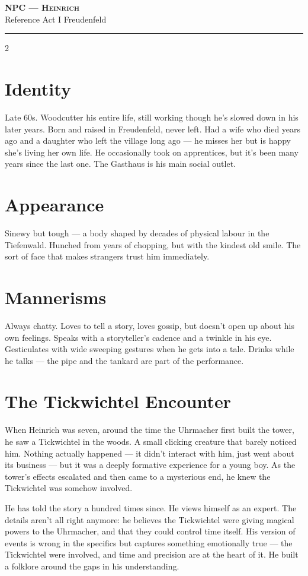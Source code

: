 \documentclass[10pt,letterpaper]{article}
\newcommand{\sceneheader}[4]{%
  \fancyhead[L]{\small\textcolor{accent}{\scshape #1}}%
  \fancyhead[R]{\small\textcolor{accent}{#2 \quad \textbullet \quad #3}}%
  \begin{center}
  {\LARGE\bfseries\scshape\textcolor{accent}{#1}}\\[2pt]
  {\small #2 \quad \textbullet \quad #3 \quad \textbullet \quad #4}\\[2pt]
  \textcolor{rulecol}{\rule{0.5\textwidth}{0.8pt}}
  \end{center}
  \vspace{-4pt}
}
\begin{document}
\label{sec:npc-heinrich}\sceneheader{NPC --- Heinrich}{Reference}{Act I}{Freudenfeld}

\begin{multicols}{2}

\section*{Identity}
Late 60s. Woodcutter his entire life, still working though he's slowed down in his later years. Born and raised in Freudenfeld, never left. Had a wife who died years ago and a daughter who left the village long ago --- he misses her but is happy she's living her own life. He occasionally took on apprentices, but it's been many years since the last one. The Gasthaus is his main social outlet.

\section*{Appearance}
Sinewy but tough --- a body shaped by decades of physical labour in the Tiefenwald. Hunched from years of chopping, but with the kindest old smile. The sort of face that makes strangers trust him immediately.

\section*{Mannerisms}
Always chatty. Loves to tell a story, loves gossip, but doesn't open up about his own feelings. Speaks with a storyteller's cadence and a twinkle in his eye. Gesticulates with wide sweeping gestures when he gets into a tale. Drinks while he talks --- the pipe and the tankard are part of the performance.

\section*{The Tickwichtel Encounter}
When Heinrich was seven, around the time the Uhrmacher first built the tower, he saw a Tickwichtel in the woods. A small clicking creature that barely noticed him. Nothing actually happened --- it didn't interact with him, just went about its business --- but it was a deeply formative experience for a young boy. As the tower's effects escalated and then came to a mysterious end, he knew the Tickwichtel was somehow involved.

He has told the story a hundred times since. He views himself as an expert. The details aren't all right anymore: he believes the Tickwichtel were giving magical powers to the Uhrmacher, and that they could control time itself. His version of events is wrong in the specifics but captures something emotionally true --- the Tickwichtel were involved, and time and precision are at the heart of it. He built a folklore around the gaps in his understanding.


\end{multicols}
\end{document}
